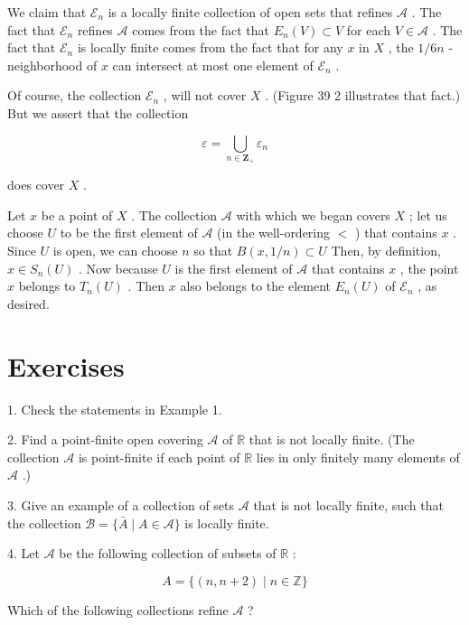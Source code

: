 We claim that \({\mathcal{E}}_{n}\) is a locally finite collection of open sets that refines \(\mathcal{A}\) . The fact that \({\mathcal{E}}_{n}\) refines \(\mathcal{A}\) comes from the fact that \({E}_{n}\left( V\right)  \subset  V\) for each \(V \in  \mathcal{A}\) . The fact that \({\mathcal{E}}_{n}\) is locally finite comes from the fact that for any \(x\) in \(X\) , the \(1/{6n}\) -neighborhood of \(x\) can intersect at most one element of \({\mathcal{E}}_{n}\) .

Of course, the collection \({\mathcal{E}}_{n}\) , will not cover \(X\) . (Figure 39 2 illustrates that fact.) But we assert that the collection

\[
\varepsilon  = \mathop{\bigcup }\limits_{{n \in  {\mathbf{Z}}_{ + }}}{\varepsilon }_{n}
\]

does cover \(X\) .

Let \(x\) be a point of \(X\) . The collection \(\mathcal{A}\) with which we began covers \(X\) ; let us choose \(U\) to be the first element of \(\mathcal{A}\) (in the well-ordering \(<\) ) that contains \(x\) . Since \(U\) is open, we can choose \(n\) so that \(B\left( {x,1/n}\right)  \subset  U\) Then, by definition, \(x \in  {S}_{n}\left( U\right)\) . Now because \(U\) is the first element of \(\mathcal{A}\) that contains \(x\) , the point \(x\) belongs to \({T}_{n}\left( U\right)\) . Then \(x\) also belongs to the element \({E}_{n}\left( U\right)\) of \({\mathcal{E}}_{n}\) , as desired.

\section*{Exercises}

1. Check the statements in Example 1.

2. Find a point-finite open covering \(\mathcal{A}\) of \(\mathbb{R}\) that is not locally finite. (The collection \(\mathcal{A}\) is point-finite if each point of \(\mathbb{R}\) lies in only finitely many elements of \(\mathcal{A}\) .)

3. Give an example of a collection of sets \(\mathcal{A}\) that is not locally finite, such that the collection \(\mathcal{B} = \{ \bar{A} \mid  A \in  \mathcal{A}\}\) is locally finite.

4. Let \(\mathcal{A}\) be the following collection of subsets of \(\mathbb{R}\) :

\[
A = \{ \left( {n,n + 2}\right)  \mid  n \in  \mathbb{Z}\}
\]

Which of the following collections refine \(\mathcal{A}\) ?

